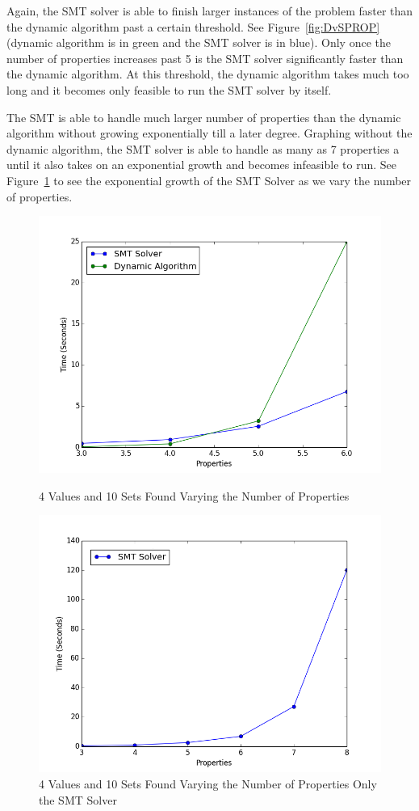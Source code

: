 \documentclass[pageno]{jpaper}
\begin{document}
Again, the SMT solver is able to finish larger instances of the problem faster than the dynamic algorithm past a certain threshold. See Figure~\ref{fig:DvSPROP} (dynamic algorithm is in green and the SMT solver is in blue). Only once the number of properties increases past 5 is the SMT solver significantly faster than the dynamic algorithm. At this threshold, the dynamic algorithm takes much too long and it becomes only feasible to run the SMT solver by itself. 


The SMT is able to handle much larger number of properties than the dynamic algorithm without growing exponentially till a later degree. Graphing without the dynamic algorithm, the SMT solver is able to handle as many as 7 properties a until it also takes on an exponential growth and becomes infeasible to run. See Figure~\ref{fig:SMTProp} to see the exponential growth of the SMT Solver as we vary the number of properties. 

\begin{figure}[htbb]
\begin{minipage}[b]{0.5\linewidth}
\centering
\includegraphics[width=.75\linewidth]{DvSPROP-v4p3456n10.png}
\caption{4 Values and 10 Sets Found Varying the Number of Properties}
\label{fig:DvSPROP}
\end{minipage}
\hspace{0.5cm}
\begin{minipage}[b]{0.5\linewidth}
\centering
\includegraphics[width=.75\linewidth]{SMTOnlyPROP-v4p345678n10.png}
\caption{4 Values and 10 Sets Found Varying the Number of Properties Only the SMT Solver}
\label{fig:SMTProp}
\end{minipage}
\end{figure}
\end{document}
